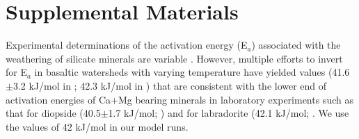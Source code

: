 \documentclass[11pt,letterpaper]{article}
\begin{document}
\section{Supplemental Materials}

Experimental determinations of the activation energy (E$_a$) associated with the weathering of silicate minerals are variable \citep{Brantley2003a}. However, multiple efforts to invert for E$_a$ in basaltic watersheds with varying temperature have yielded values (41.6$\pm$3.2 kJ/mol in \citealp{Li2016a}; 42.3 kJ/mol in \citealp{Dessert2001a}) that are consistent with the lower end of activation energies of Ca+Mg bearing minerals in laboratory experiments such as that for diopside (40.5$\pm$1.7 kJ/mol; \citealp{Knauss1993a}) and for labradorite (42.1 kJ/mol; \citealp{Carroll2005a}. We use the values of 42 kJ/mol in our model runs.

\end{document}
